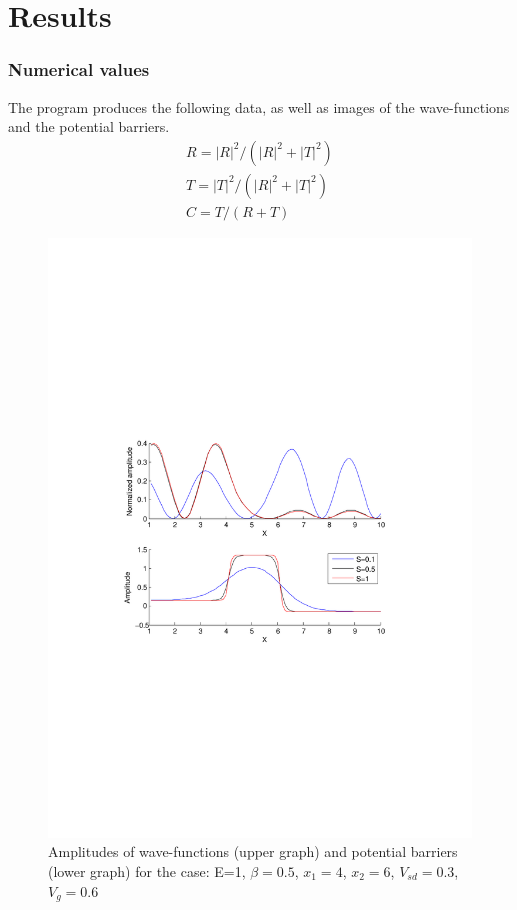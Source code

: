 \documentclass[•]{beamer}
\theoremstyle{remark}
\begin{document}
\section{Results}
\begin{frame}\frametitle{Numerical values}
\begin{block}

The program produces the following data, as well as images of the wave-functions and the potential barriers.
\begin{eqnarray*}
R=|R|^2/(|R|^2+|T|^2)\\
T=|T|^2/(|R|^2+|T|^2)\\
C = T/(R+T)
\end{eqnarray*}
\end{block}
\end{frame}

\begin{frame}
\begin{figure}[h!]
\centering
\includegraphics[scale=0.4]{test}
\caption{Amplitudes of wave-functions (upper graph) and potential barriers (lower graph) for the case: E=1, $\beta=0.5$, $x_1=4$, $x_2=6$, $V_{sd}=0.3$, $V_g=0.6$}
\label{fig:test}
\end{figure}
\end{frame}
\end{document}
